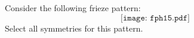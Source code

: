 \documentclass{ximera}
\author{Bart Snapp}
\begin{document}
\begin{exercise}
  Consider the following frieze pattern:
  \[
  \texttt{[image: fph15.pdf]}
  \]
  Select all symmetries for this pattern.
  \begin{selectAll}
  \end{selectAll}
\end{exercise}
\end{document}
